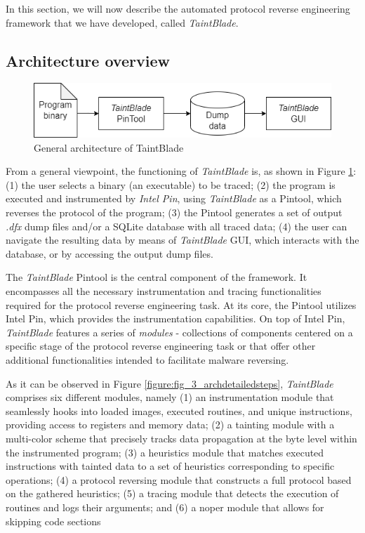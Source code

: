 \documentclass[conference]{IEEEtran}
\begin{document}
In this section, we will now describe the automated protocol reverse
engineering framework that we have developed, called \textit{TaintBlade}.

\subsection{Architecture overview}

\begin{figure}[htbp]
    \centerline{\includegraphics[width=0.9\columnwidth]{images/generalarch.drawio.png}}
    \caption{General architecture of TaintBlade}
    \label{fig_3_generalarch}
\end{figure}

From a general viewpoint, the functioning of \textit{TaintBlade} is, as shown
in Figure \ref{fig_3_generalarch}: (1) the user selects a binary (an
executable) to be traced; (2) the program is executed and instrumented by
\textit{Intel Pin}, using \textit{TaintBlade} as a Pintool, which reverses the
protocol of the program; (3) the Pintool generates a set of output
\textit{.dfx} dump files and/or a SQLite database with all traced data; (4) the
user can navigate the resulting data by means of \textit{TaintBlade} GUI, which
interacts with the database, or by accessing the output dump files.

The \textit{TaintBlade} Pintool is the central component of the framework. It
encompasses all the necessary instrumentation and tracing functionalities
required for the protocol reverse engineering task. At its core, the Pintool
utilizes Intel Pin, which provides the instrumentation capabilities. On top of
Intel Pin, \textit{TaintBlade} features a series of \textit{modules} -
collections of components centered on a specific stage of the protocol reverse
engineering task or that offer other additional functionalities intended to
facilitate malware reversing.

As it can be observed in Figure \ref{figure:fig_3_archdetailedsteps},
\textit{TaintBlade} comprises six different modules, namely (1) an
instrumentation module that seamlessly hooks into loaded images, executed routines, 
and unique instructions, providing access to registers and memory data; 
(2) a tainting module with a multi-color scheme that precisely tracks data propagation 
at the byte level within the instrumented program; (3) a heuristics module that matches executed
instructions with tainted data to a set of heuristics corresponding to specific
operations; (4) a protocol reversing module that constructs a full protocol
based on the gathered heuristics; (5) a tracing module that detects the execution 
of routines and logs their arguments; and (6) a noper module
that allows for skipping code sections 
\end{document}
